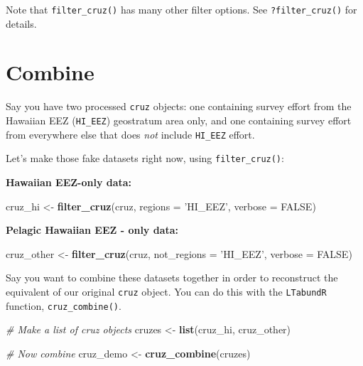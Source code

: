\documentclass[
]{book}
\newenvironment{Shaded}{\begin{snugshade}}{\end{snugshade}}
\newcommand{\CommentTok}[1]{\textcolor[rgb]{0.56,0.35,0.01}{\textit{#1}}}
\newcommand{\DataTypeTok}[1]{\textcolor[rgb]{0.13,0.29,0.53}{#1}}
\newcommand{\KeywordTok}[1]{\textcolor[rgb]{0.13,0.29,0.53}{\textbf{#1}}}
\newcommand{\NormalTok}[1]{#1}
\newcommand{\OtherTok}[1]{\textcolor[rgb]{0.56,0.35,0.01}{#1}}
\newcommand{\StringTok}[1]{\textcolor[rgb]{0.31,0.60,0.02}{#1}}
\begin{document}
Note that \texttt{filter\_cruz()} has many other filter options. See \texttt{?filter\_cruz()} for details.

\hypertarget{combine}{%
\section*{Combine}\label{combine}}

Say you have two processed \texttt{cruz} objects: one containing survey effort from the Hawaiian EEZ (\texttt{HI\_EEZ}) geostratum area only, and one containing survey effort from everywhere else that does \emph{not} include \texttt{HI\_EEZ} effort.

Let's make those fake datasets right now, using \texttt{filter\_cruz()}:

\textbf{Hawaiian EEZ-only data:}

\begin{Shaded}
\begin{Highlighting}[]
\NormalTok{cruz_hi <-}\StringTok{ }\KeywordTok{filter_cruz}\NormalTok{(cruz, }
                            \DataTypeTok{regions =} \StringTok{'HI_EEZ'}\NormalTok{, }
                            \DataTypeTok{verbose =} \OtherTok{FALSE}\NormalTok{)}
\end{Highlighting}
\end{Shaded}

\textbf{Pelagic Hawaiian EEZ - only data:}

\begin{Shaded}
\begin{Highlighting}[]
\NormalTok{cruz_other <-}\StringTok{ }\KeywordTok{filter_cruz}\NormalTok{(cruz, }
                           \DataTypeTok{not_regions =} \StringTok{'HI_EEZ'}\NormalTok{, }
                           \DataTypeTok{verbose =} \OtherTok{FALSE}\NormalTok{)}
\end{Highlighting}
\end{Shaded}

Say you want to combine these datasets together in order to reconstruct the equivalent of our original \texttt{cruz} object. You can do this with the \texttt{LTabundR} function, \texttt{cruz\_combine()}.

\begin{Shaded}
\begin{Highlighting}[]
\CommentTok{# Make a list of cruz objects}
\NormalTok{cruzes <-}\StringTok{ }\KeywordTok{list}\NormalTok{(cruz_hi, cruz_other)}

\CommentTok{# Now combine}
\NormalTok{cruz_demo <-}\StringTok{ }\KeywordTok{cruz_combine}\NormalTok{(cruzes)}
\end{Highlighting}
\end{Shaded}
\end{document}
